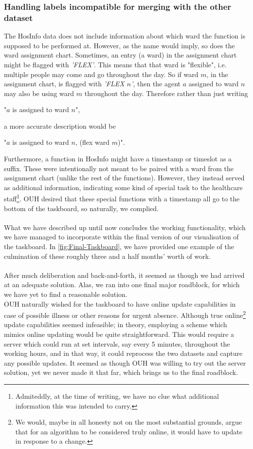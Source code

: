 \subsubsection*{Handling labels incompatible for     merging with the other dataset}
The HosInfo data does not include information about which ward the \gls{function} is supposed to be performed at. However, as the name would imply, so does the ward assignment chart. Sometimes, an entry (a ward) in the assignment chart might be flagged with \emph{'FLEX'}. This means that that ward is "flexible", i.e. multiple people may come and go throughout the day. So if ward \(m\), in the assignment chart, is flagged with \emph{'FLEX \(n\)'}, then the agent \(a\) assigned to ward \(n\) may also be using ward \(m\) throughout the day. Therefore rather than just writing
\begin{center}
    "\(a\) is assigned to ward \(n\)",
\end{center}
a more accurate description would be
\begin{center}
    "\(a\) is assigned to ward \(n\), (flex ward \(m\))".
\end{center} 
Furthermore, a \gls{function} in HosInfo might have a timestamp or timeslot as a suffix. These were intentionally not meant to be paired with a ward from the assignment chart (unlike the rest of the \gls{functions}). However, they instead served as additional information, indicating some kind of special task to the healthcare staff\footnote{Admiteddly, at the time of writing, we have no clue what additional information this was intended to carry.}. OUH desired that these special functions with a timestamp all go to the bottom of the taskboard, so naturally, we complied.
\\
\\
What we have described up until now concludes the working functionality, which we have managed to incorporate within the final version of our visualisation of the taskboard. In \autoref{fig:Final-Taskboard}, we have provided one example of the culmination of these roughly three and a half months' worth of work.
\\
\\
After much deliberation and back-and-forth, it seemed as though we had arrived at an adequate solution. Alas, we ran into one final major roadblock, for which we have yet to find a reasonable solution.
\\
OUH naturally wished for the taskboard to have online update capabilities in case of possible illness or other reasons for urgent absence. Although true online\footnote{We would, maybe in all honesty not on the most substantial grounds, argue that for an algorithm to be considered truly online, it would have to update in response to a change.} update capabilities seemed infeasible; in theory, employing a scheme which mimics online updating would be quite straightforward. This would require a server which could run at set intervals, say every 5 minutes, throughout the working hours, and in that way, it could reprocess the two datasets and capture any possible updates. It seemed as though OUH was willing to try out the server solution, yet we never made it that far, which brings us to the final roadblock.
